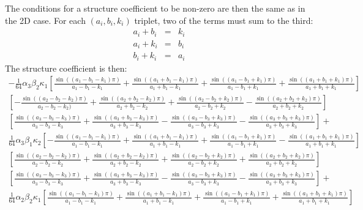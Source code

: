 \documentclass[12pt,onecolumn]{article}
\begin{document}
The conditions for a structure coefficient to be non-zero are then the same as in the 2D case. For each $(a_i, b_i, k_i)$ triplet, two of the terms must sum to the third:
\begin{eqnarray*}
a_i + b_i &=& k_i \\
a_i + k_i &=& b_i \\
b_i + k_i &=& a_i
\end{eqnarray*}
The structure coefficient is then:
\begin{equation}
\begin{split}
-\frac{1}{64} \alpha_3 \beta_2 \kappa_1 
   \left[\frac{\sin((a_1 - b_1 - k_1) \pi)}{a_1 - b_1 - k_1} + 
    \frac{\sin((a_1 + b_1 - k_1) \pi)}{a_1 + b_1 - k_1} + 
    \frac{\sin((a_1 - b_1 + k_1) \pi)}{a_1 - b_1 + k_1} + 
    \frac{\sin((a_1 + b_1 + k_1) \pi)}{a_1 + b_1 + k_1}\right]\\
   \left[-\frac{\sin((a_2 - b_2 - k_2) \pi)}{a_2 - b_2 - k_2)} + 
    \frac{\sin((a_2 + b_2 - k_2) \pi)}{a_2 + b_2 - k_2} + 
    \frac{\sin((a_2 - b_2 + k_2) \pi)}{a_2 - b_2 + k_2} - 
    \frac{\sin((a_2 + b_2 + k_2) \pi)}{a_2 + b_2 + k_2}\right]\\
   \left[\frac{\sin((a_3 - b_3 - k_3) \pi)}{a_3 - b_3 - k_3} + 
    \frac{\sin((a_3 + b_3 - k_3) \pi)}{a_3 + b_3 - k_3} - 
    \frac{\sin((a_3 - b_3 + k_3) \pi)}{a_3 - b_3 + k_3} - 
    \frac{\sin((a_3 + b_3 + k_3) \pi)}{a_3 + b_3 + k_3}\right] +\\ 
 \frac{1}{64} \alpha_3 \beta_1 \kappa_2 \left[-\frac{\sin((a_1 - b_1 - k_1) \pi)}{
     a_1 - b_1 - k_1} + \frac{\sin((a_1 + b_1 - k_1) \pi)}{a_1 + b_1 - k_1} + 
    \frac{\sin((a_1 - b_1 + k_1) \pi)}{a_1 - b_1 + k_1} - 
    \frac{\sin((a_1 + b_1 + k_1) \pi)}{a_1 + b_1 + k_1}\right]\\ 
   \left[\frac{\sin((a_2 - b_2 - k_2) \pi)}{a_2 - b_2 - k_2} + 
    \frac{\sin((a_2 + b_2 - k_2) \pi)}{a_2 + b_2 - k_2} + 
    \frac{\sin((a_2 - b_2 + k_2) \pi)}{a_2 - b_2 + k_2} + 
    \frac{\sin((a_2 + b_2 + k_2) \pi)}{a_2 + b_2 + k_2}\right]\\
   \left[\frac{\sin((a_3 - b_3 - k_3) \pi)}{a_3 - b_3 - k_3} + 
    \frac{\sin((a_3 + b_3 - k_3) \pi)}{a_3 + b_3 - k_3} - 
    \frac{\sin((a_3 - b_3 + k_3) \pi)}{a_3 - b_3 + k_3} - 
    \frac{\sin((a_3 + b_3 + k_3) \pi)}{a_3 + b_3 + k_3}\right] +\\
\frac{1}{64} \alpha_2 \beta_2 \kappa_1 \left[\frac{\sin((a_1 - b_1 - k_1) \pi)}{a_1 - b_1 - k_1} + 
    \frac{\sin((a_1 + b_1 - k_1) \pi)}{a_1 + b_1 - k_1} + 
    \frac{\sin((a_1 - b_1 + k_1) \pi)}{a_1 - b_1 + k_1} + 
    \frac{\sin((a_1 + b_1 + k_1) \pi)}{a_1 + b_1 + k_1}\right]\\

\end{split}
\end{equation}
\end{document}
